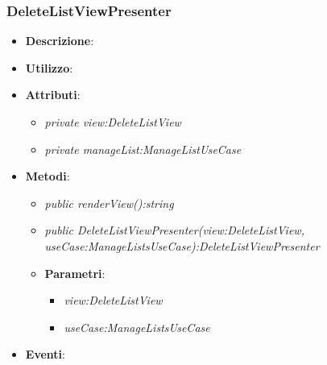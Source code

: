 \subsubsection{DeleteListViewPresenter}
\begin{itemize}
\item \textbf{Descrizione}: 
\item \textbf{Utilizzo}:
\item \textbf{Attributi}: 
	\begin{itemize}
	\item \textit{private view:DeleteListView}\\
	
	\item \textit{private manageList:ManageListUseCase}\\
	
	\end{itemize}
\item \textbf{Metodi}:
	\begin{itemize}
	\item \textit{public renderView():string}\\
	
	\item \textit{public DeleteListViewPresenter(view:DeleteListView, useCase:ManageListsUseCase):DeleteListViewPresenter}\\
	
		\item{\textbf{Parametri}: \begin{itemize}
		\item \textit{view:DeleteListView}\\

		\item \textit{useCase:ManageListsUseCase}\\
		
		\end{itemize}}
	\end{itemize}
\item \textbf{Eventi}:
\end{itemize}